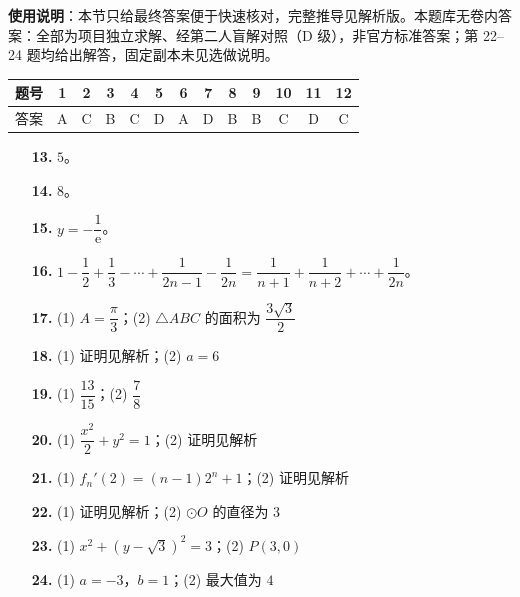 
\begin{gknotice}
\textbf{使用说明}：本节只给最终答案便于快速核对，完整推导见解析版。本题库无卷内答案：全部为项目独立求解、经第二人盲解对照（D 级），非官方标准答案；第 22–24 题均给出解答，固定副本未见选做说明。
\end{gknotice}

\begin{center}\begin{tabular}{ccccccccccccc}
\toprule
题号 & 1 & 2 & 3 & 4 & 5 & 6 & 7 & 8 & 9 & 10 & 11 & 12 \\
\midrule
答案 & A & C & B & C & D & A & D & B & B & C & D & C \\
\bottomrule
\end{tabular}\end{center}

\begin{itemize}[leftmargin=2.6em]
  \item[\textbf{13.}] $5$。
  \item[\textbf{14.}] $8$。
  \item[\textbf{15.}] $y=-\dfrac{1}{\mathrm{e}}$。
  \item[\textbf{16.}] $1-\dfrac{1}{2}+\dfrac{1}{3}-\cdots+\dfrac{1}{2n-1}-\dfrac{1}{2n}=\dfrac{1}{n+1}+\dfrac{1}{n+2}+\cdots+\dfrac{1}{2n}$。
\end{itemize}

\begin{itemize}[leftmargin=2.6em]
  \item[\textbf{17.}] (1) $A=\dfrac{\pi}{3}$；(2) $\triangle ABC$ 的面积为 $\dfrac{3\sqrt{3}}{2}$
  \item[\textbf{18.}] (1) 证明见解析；(2) $a=6$
  \item[\textbf{19.}] (1) $\dfrac{13}{15}$；(2) $\dfrac{7}{8}$
  \item[\textbf{20.}] (1) $\dfrac{x^{2}}{2}+y^{2}=1$；(2) 证明见解析
  \item[\textbf{21.}] (1) $f_{n}'(2)=(n-1)2^{n}+1$；(2) 证明见解析
  \item[\textbf{22.}] (1) 证明见解析；(2) $\odot O$ 的直径为 $3$
  \item[\textbf{23.}] (1) $x^{2}+(y-\sqrt{3})^{2}=3$；(2) $P(3,0)$
  \item[\textbf{24.}] (1) $a=-3$，$b=1$；(2) 最大值为 $4$
\end{itemize}

